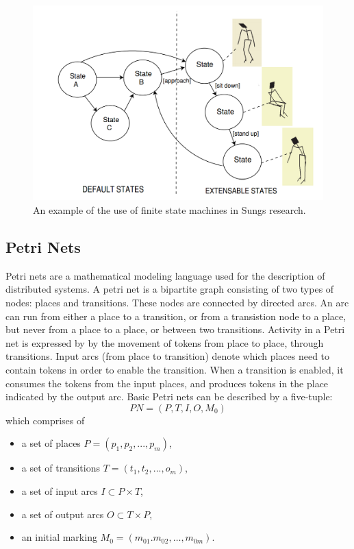 \documentclass[11pt, a4paper]{book}
\begin{document}
\begin{figure}[h]
\centering
\includegraphics[width=.6\textwidth]{./statemachine_situations.png}
\caption{An example of the use of finite state machines in Sungs research.}
\label{fig:sungstatemachine}
\end{figure}


\subsection{Petri Nets}
Petri nets are a mathematical modeling language used for the description of distributed systems. A petri net is a bipartite graph consisting of two types of nodes: places and transitions. These nodes are connected by directed arcs. An arc can run from either a place to a transition, or from a transistion node to a place, but never from a place to a place, or between two transitions. Activity in a Petri net is expressed by by the movement of tokens from place to place, through transitions. Input arcs (from place to transition) denote which places need to contain tokens in order to enable the transition. When a transition is enabled, it consumes the tokens from the input places, and produces tokens in the place indicated by the output arc.
Basic Petri nets can be described by a five-tuple:
\begin{equation}
PN = (P,T,I,O,M_0)
\end{equation}
which comprises of
\begin{itemize}
\item a set of places $P = (p_1, p_2, ..., p_m)$,
\item a set of transitions $T = (t_1, t_2, ...,o_m)$,
\item a set of input arcs $I \subset P \times T$,
\item a set of output arcs $O \subset T \times P$,
\item an initial marking $M_0 = (m_{01}. m_{02}, \ldots, m_{0m})$.
\end{itemize}
\end{document}
